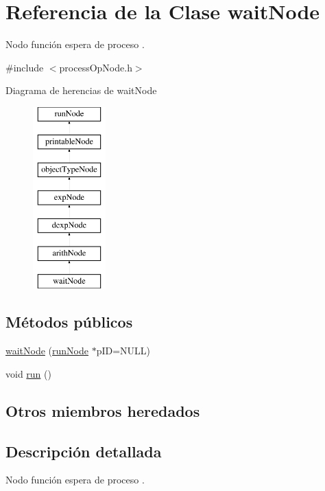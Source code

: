 \hypertarget{classwaitNode}{\section{Referencia de la Clase wait\-Node}
\label{classwaitNode}
}


Nodo función espera de proceso .  




{\ttfamily \#include $<$process\-Op\-Node.\-h$>$}

Diagrama de herencias de wait\-Node\begin{figure}[H]
\begin{center}
\leavevmode
\includegraphics[height=7.000000cm]{classwaitNode}
\end{center}
\end{figure}
\subsection*{Métodos públicos}
\begin{DoxyCompactItemize}
\item 
\hyperlink{classwaitNode_a8276a86d50663d11bd6762a144282c20}{wait\-Node} (\hyperlink{classrunNode}{run\-Node} $\ast$p\-I\-D=N\-U\-L\-L)
\item 
void \hyperlink{classwaitNode_a89cb8462c00751c8c374d6e3b8bf0c4b}{run} ()
\end{DoxyCompactItemize}
\subsection*{Otros miembros heredados}


\subsection{Descripción detallada}
Nodo función espera de proceso . 

